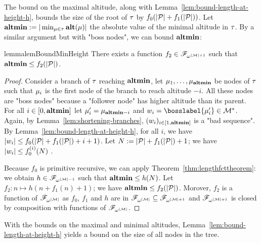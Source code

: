 The bound on the maximal altitude, along with Lemma~\ref{lem:bound-length-at-height-h}, bounds the size of the root of $\tau$ by $f_0(|\mathcal{P}| + f_1(|\mathcal{P}|))$. Let $\mathbf{altmin} := |\min_{\mu \in \tau} \mathbf{alt}(\mu)|$ the absolute value of the minimal altitude in $\tau$. By a similar argument but with "boss nodes", we can bound $\mathbf{altmin}$:


\begin{restatable}{lemma}{lemBoundMinHeight}
	\label{lem:bound-min-height}
	There exists a function $f_2 \in \mathscr{F}_{\omega^{|\mathcal{M}|+1}}$ such that $\mathbf{altmin} \leq f_2(|\mathcal{P}|)$.
\end{restatable}

\begin{proof}
	Consider a branch of $\tau$ reaching $\mathbf{altmin}$, let $\mu_1, \ldots, \mu_{\mathbf{altmin}}$ be nodes of $\tau$ such that $\mu_i$ is the first node of the branch to reach altitude $-i$. All these nodes are "boss nodes" because a "follower node" has higher altitude than its parent. 
	For all $i \in [0,\mathbf{altmin}]$ let $\mu'_i = \mu_{\mathbf{altmin}-i}$ and $w_i = \bosslabel{\node'_{i}} \in \messages^*$.
	Again, by Lemma~\ref{lem:shortening-branches}, $(w_i)_{i \in [1,\mathbf{altmin}]}$ is a "bad sequence".
	By Lemma~\ref{lem:bound-length-at-height-h}, for all $i$, we have $|w_i| \leq f_0(|\mathcal{P}|+f_1(|\mathcal{P}|) +i+1)$. Let $N := |\mathcal{P}|+f_1(|\mathcal{P}|)+1$; we have $|w_i| \leq f_0^{(i)}(N)$ .  
	
	Because $f_0$ is primitive recursive, we can apply Theorem~\ref{thm:lengthfcttheorem}: we obtain $h \in \mathscr{F}_{\omega^{|\mathcal{M}|-1}}$ such that $\mathbf{altmin} \leq h(N)$. Let $f_2: n \mapsto h(n+ f_1(n) + 1)$; we have $\mathbf{altmin} \leq f_2(|\mathcal{P}|)$. Morover, $f_2$ is a function of $\mathscr{F}_{\omega^{|\mathcal{M}|}}$ as $f_0$, $f_1$ and $h$ are in $\mathscr{F}_{\omega^{|\mathcal{M}|}} \subseteq \mathscr{F}_{\omega^{|\mathcal{M}|+1}}$ and $\mathscr{F}_{\omega^{|\mathcal{M}|+1}}$ is closed by composition with functions of $\mathscr{F}_{\omega^{|\mathcal{M}|}}$. 
\end{proof}

With the bounds on the maximal and minimal altitudes, Lemma~\ref{lem:bound-length-at-height-h} yields a bound on the size of all nodes in the tree.


